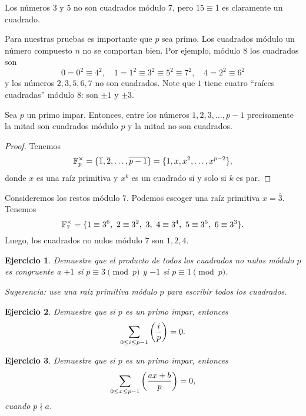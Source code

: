 \documentclass{article}
\theoremstyle{plain}
\newtheorem{ejerc}{Ejercicio}
\begin{document}
\begin{ejemplo}
  Los números $3$ y $5$ no son cuadrados módulo $7$, pero $15 \equiv 1$ es
  claramente un cuadrado.
\end{ejemplo}

\begin{comentario}
  Para nuestras pruebas es importante que $p$ sea primo. Los cuadrados módulo un
  número compuesto $n$ no se comportan bien. Por ejemplo, módulo $8$ los
  cuadrados son
  $$0 = 0^2 \equiv 4^2, \quad 1 = 1^2 \equiv 3^2 \equiv 5^2 \equiv 7^2, \quad 4 = 2^2 \equiv 6^2$$
  y los números $2,3,5,6,7$ no son cuadrados. Note que $1$ tiene cuatro
  ``raíces cuadradas'' módulo $8$: son $\pm 1$ y $\pm 3$.
\end{comentario}

\begin{proposicion}
  Sea $p$ un primo impar. Entonces, entre los números $1, 2, 3, \ldots, p-1$
  precisamente la mitad son cuadrados módulo $p$ y la mitad no son cuadrados.

  \begin{proof}
    Tenemos
    $$\mathbb{F}_p^\times = \{ \overline{1}, \overline{2}, \ldots, \overline{p-1} \} = \{ 1, x, x^2, \ldots, x^{p-2} \},$$
    donde $x$ es una raíz primitiva y $x^k$ es un cuadrado si y solo si $k$ es
    par.
  \end{proof}
\end{proposicion}

\begin{ejemplo}
  Consideremos los restos módulo $7$. Podemos escoger una raíz primitiva
  $x = \overline{3}$. Tenemos
  $$\mathbb{F}_{7}^\times = \{ 1 \equiv 3^6, ~ 2\equiv 3^2, ~ 3, ~ 4 \equiv 3^4, ~ 5 \equiv 3^5, ~ 6 \equiv 3^3  \}.$$
  Luego, los cuadrados no nulos módulo $7$ son $1, 2, 4$.
\end{ejemplo}

\begin{ejerc}
  Demuestre que el producto de todos los cuadrados no nulos módulo $p$ es
  congruente a $+1$ si ${p \equiv 3 \pmod{p}}$ y $-1$ si
  ${p \equiv 1 \pmod{p}}$.

  Sugerencia: use una raíz primitiva módulo $p$ para escribir todos los
  cuadrados.
\end{ejerc}

\begin{ejerc}
  Demuestre que si $p$ es un primo impar, entonces
  $$\sum_{0 \le i \le p-1} \left(\frac{i}{p}\right) = 0.$$
\end{ejerc}

\begin{ejerc}
  Demuestre que si $p$ es un primo impar, entonces
  $$\sum_{0 \le x \le p-1} \left(\frac{ax+b}{p}\right) = 0,$$
  cuando $p \nmid a$.
\end{ejerc}
\end{document}
